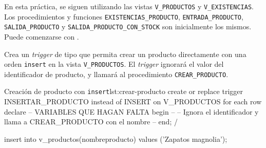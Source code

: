 En esta práctica, se siguen utilizando las vistas \texttt{V\_PRODUCTOS} y \texttt{V\_EXISTENCIAS}. Los procedimientos y funciones \texttt{EXISTENCIAS\_PRODUCTO}, \texttt{ENTRADA\_PRODUCTO}, \texttt{SALIDA\_PRODUCTO} y \texttt{SALIDA\_PRODUCTO\_CON\_STOCK} son inicialmente los mismos. Puede comenzarse con .


\begin{homeworkProblem}
  Crea un \textit{trigger} de tipo  que permita crear un producto directamente con una orden \texttt{insert} en la vista \texttt{V\_PRODUCTOS}. El \textit{trigger} ignorará el valor del identificador de producto, y llamará al procedimiento \texttt{CREAR\_PRODUCTO}.
  
\begin{listadosql}{Creación de producto con \texttt{insert}}{lst:crear-producto}
create or replace trigger INSERTAR_PRODUCTO
instead of INSERT on V_PRODUCTOS
for each row
declare
-- VARIABLES QUE HAGAN FALTA
begin
-- 
-- Ignora el identificador y llama a CREAR_PRODUCTO con el nombre
-- 
end;
/


insert into v_productos(nombreproducto) values ('Zapatos magnolia');

\end{listadosql}

\end{homeworkProblem}

